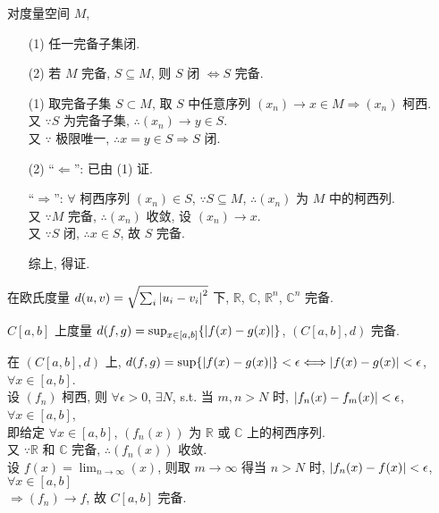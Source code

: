 \documentclass{note}
\begin{document}
\begin{thm}[(课本定理 12.6)]
    对度量空间 $M$,
    \begin{itemize}
        \item[(1)] 任一完备子集闭.
        \item[(2)] 若 $M$ 完备, $S\subseteq M$, 则 $S$ 闭 $\Longleftrightarrow S$ 完备.
    \end{itemize}
\end{thm}
\begin{pf}
    \begin{itemize}
        \item[(1)] 取完备子集 $S\subset M$, 取 $S$ 中任意序列 $(x_n)\rightarrow x\in M\Longrightarrow(x_n)$ 柯西.\\
        又 $\because S$ 为完备子集, $\therefore(x_n)\rightarrow y\in S$.\\
        又 $\because$ 极限唯一, $\therefore x=y\in S\Longrightarrow S$ 闭.
        \item[(2)] ``$\Longleftarrow$'': 已由 (1) 证.

        ``$\Longrightarrow$'': $\forall$ 柯西序列 $(x_n)\in S$, $\because S\subseteq M$, $\therefore(x_n)$ 为 $M$ 中的柯西列.\\
        又 $\because M$ 完备, $\therefore(x_n)$ 收敛, 设 $(x_n)\rightarrow x$.\\
        又 $\because S$ 闭, $\therefore x\in S$, 故 $S$ 完备.

        综上, 得证.
    \end{itemize}
\end{pf}

\begin{eg}
    在欧氏度量 $d(u,v)=\sqrt{\sum_i\left\lvert u_i-v_i\right\rvert^2}$ 下, $\mathbb{R}$, $\mathbb{C}$, $\mathbb{R}^n$, $\mathbb{C}^n$ 完备.
\end{eg}

\begin{eg}[(课本例 12.11)]
    $C[a,b]$ 上度量 $d(f,g)=\sup_{x\in[a,b]}\{\left\lvert f(x)-g(x)\right\rvert\}$, $(C[a,b],d)$ 完备.
    \begin{pf}
        在 $(C[a,b],d)$ 上, $d(f,g)=\sup\{\left\lvert f(x)-g(x)\right\rvert\}<\epsilon\Longleftrightarrow\left\lvert f(x)-g(x)\right\rvert<\epsilon$, $\forall x\in[a,b]$.\\
        设 $(f_n)$ 柯西, 则 $\forall\epsilon>0$, $\exists N$, s.t. 当 $m,n>N$ 时, $\left\lvert f_n(x)-f_m(x)\right\rvert<\epsilon$, $\forall x\in[a,b]$,\\
        即给定 $\forall x\in[a,b]$, $(f_n(x))$ 为 $\mathbb{R}$ 或 $\mathbb{C}$ 上的柯西序列.\\
        又 $\because\mathbb{R}$ 和 $\mathbb{C}$ 完备, $\therefore(f_n(x))$ 收敛.\\
        设 $f(x)=\lim_{n\rightarrow\infty}(x)$, 则取 $m\rightarrow\infty$ 得当 $n>N$ 时, $\left\lvert f_n(x)-f(x)\right\rvert<\epsilon$, $\forall x\in[a,b]$\\
        $\Longrightarrow(f_n)\rightarrow f$, 故 $C[a,b]$ 完备.
    \end{pf}
\end{eg}
\end{document}
